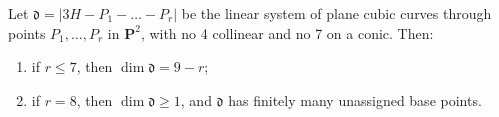 Let $\mathfrak{d} = |3H - P_1 - \ldots - P_r|$ be the linear system of plane cubic curves through points $P_1, \ldots, P_r$ in $\mathbf{P}^2$, with no 4 collinear and no 7 on a conic. Then:
\begin{enumerate}
\item[(a)] if $r \leqslant 7$, then $\dim \mathfrak{d} = 9 - r$;
\item[(b)] if $r = 8$, then $\dim \mathfrak{d} \geqslant 1$, and $\mathfrak{d}$ has finitely many unassigned base points.
\end{enumerate}
